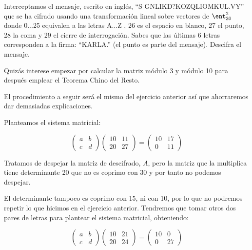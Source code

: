 \begin{problem}[5]
Interceptamos el mensaje, escrito en inglés, ``S GNLIKD?KOZQLIOMKUL.VY'' que se ha cifrado usando una transformación lineal sobre vectores de $\ent_{30}^2$ donde 0...25 equivalen a las letras A...Z , 26 es el espacio en blanco, 27 el punto, 28 la coma y 29 el cierre de interrogación. Sabes que las últimas 6 letras corresponden a la firma: ``KARLA.'' (el punto es parte del mensaje). Descifra el mensaje.

\obs Quizás interese empezar por calcular la matriz módulo 3 y módulo 10 para después emplear el Teorema Chino del Resto.

\solution
{}

El procedimiento a seguir será el mismo del ejercicio anterior así que ahorraremos dar demasiadas explicaciones.

Planteamos el sistema matricial:

\[
	\left( \begin{array}{cc}
	a & b \\
	c & d
	\end{array} \right)
	\left( \begin{array}{cc}
	10 & 11\\
	20 & 27
	\end{array} \right)
	=
	\left( \begin{array}{cc}
	10 & 17\\
	0 & 11
	\end{array} \right)
\]

Tratamos de despejar la matriz de descifrado, $A$, pero la matriz que la multiplica tiene determinante 20 que no es coprimo con 30 y por tanto no podemos despejar.

El determinante tampoco es coprimo con 15, ni con 10, por lo que no podremos repetir lo que hicimos en el ejercicio anterior. Tendremos que tomar otros dos pares de letras para plantear el sistema matricial, obteniendo:

\[
	\left( \begin{array}{cc}
	a & b \\
	c & d
	\end{array} \right)
	\left( \begin{array}{cc}
	10 & 21\\
	20 & 24
	\end{array} \right)
	=
	\left( \begin{array}{cc}
	10 & 0\\
	0 & 27
	\end{array} \right)
\]


\end{problem}
